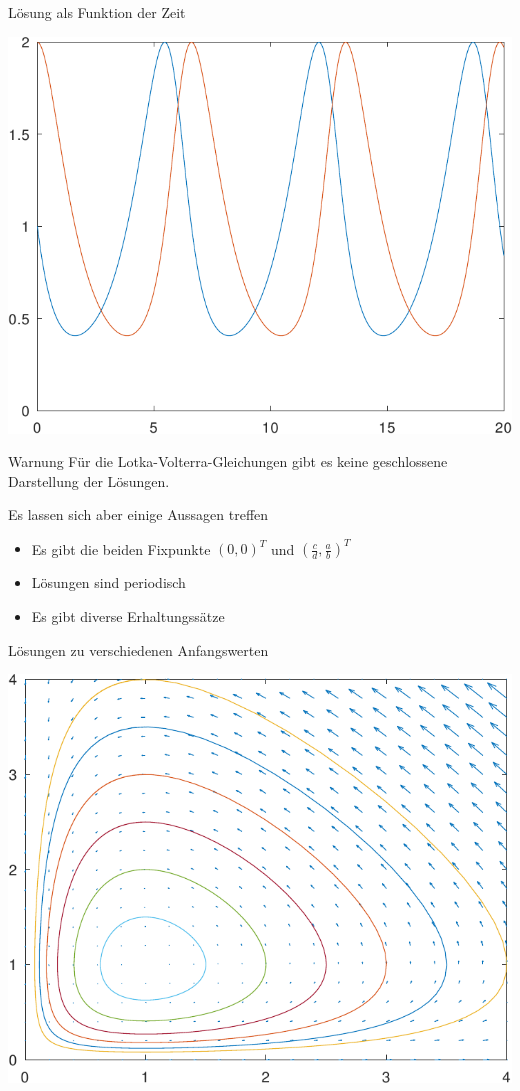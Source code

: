 \documentclass[notheorems,hidelinks,aspectratio=1610]{beamer}
\begin{document}
\begin{frame}{Lösung als Funktion der Zeit}
  \begin{center}
    \includegraphics[width=.7\textwidth]{octave/volterra-timeseries-crop.pdf}
  \end{center}  
\end{frame}

\begin{frame}
  \begin{block}{Warnung}
    Für die Lotka-Volterra-Gleichungen gibt es keine geschlossene
    Darstellung der Lösungen.
  \end{block}

  Es lassen sich aber einige Aussagen treffen
  \begin{itemize}
  \item Es gibt die beiden Fixpunkte $(0,0)^T$ und
    $\left(\tfrac cd,\tfrac ab\right)^T$
  \item Lösungen sind periodisch
  \item Es gibt diverse Erhaltungssätze
  \end{itemize}
\end{frame}

\begin{frame}{Lösungen zu verschiedenen Anfangswerten}
  \begin{center}
    \includegraphics[width=.7\textwidth]{octave/volterra-multi-crop.pdf}
  \end{center}    
\end{frame}
\end{document}
